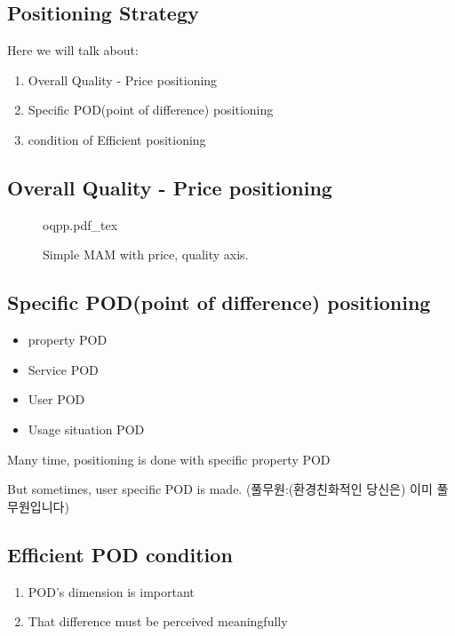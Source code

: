 \documentclass[12pt]{article}
\begin{document}
\subsection{Positioning Strategy}
Here we will talk about:
\begin{enumerate}
	\item Overall Quality - Price positioning
	\item Specific POD(point of difference) positioning
	\item condition of Efficient positioning
\end{enumerate}
\subsection{Overall Quality - Price positioning}
\begin{figure}[H]
	\centering
	\def\svgwidth{\columnwidth}
	{oqpp.pdf_tex}
	\caption{Simple MAM with price, quality axis.}
	\label{fig:oqpp}
\end{figure}



\subsection{Specific POD(point of difference) positioning}
\begin{itemize}
	\item property POD
	\item Service POD
	\item User POD
	\item Usage situation POD
\end{itemize}
{\large Many time, positioning is done with specific property POD}

But sometimes, user specific POD is made.
(풀무원:(환경친화적인 당신은) 이미 풀무원입니다)

\subsection{Efficient POD condition}
\begin{enumerate}
	\item POD's dimension is important
	\item That difference must be perceived meaningfully
\end{enumerate}
\end{document}
